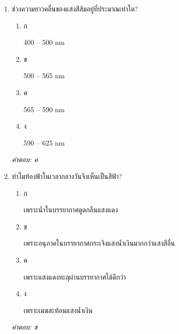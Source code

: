 \documentclass[12pt]{article}
\begin{document}
\begin{enumerate}[label=\arabic*., itemsep=0.5\baselineskip, topsep=0.5\baselineskip, leftmargin=*]
\item ช่วงความยาวคลื่นของแสงสีส้มอยู่ที่ประมาณเท่าใด?
\begin{enumerate}[label=\alph*)., itemsep=0.3\baselineskip, topsep=0.3\baselineskip]
\item ก\ 
\begin{minipage}[t]{0.9\linewidth}
\raggedright 400 – 500 nm
\end{minipage}
\item ข\ 
\begin{minipage}[t]{0.9\linewidth}
\raggedright 500 – 565 nm
\end{minipage}
\item ค\ 
\begin{minipage}[t]{0.9\linewidth}
\raggedright 565 – 590 nm
\end{minipage}
\item ง\ 
\begin{minipage}[t]{0.9\linewidth}
\raggedright 590 – 625 nm
\end{minipage}
\end{enumerate}
\vspace{-0.3\baselineskip}
\begin{small}
\textit{คำตอบ: ค}
\end{small}

\item ทำไมท้องฟ้าในเวลากลางวันจึงเห็นเป็นสีฟ้า?
\begin{enumerate}[label=\alph*)., itemsep=0.3\baselineskip, topsep=0.3\baselineskip]
\item ก\ 
\begin{minipage}[t]{0.9\linewidth}
\raggedright เพราะน้ำในบรรยากาศดูดกลืนแสงแดง
\end{minipage}
\item ข\ 
\begin{minipage}[t]{0.9\linewidth}
\raggedright เพราะอนุภาคในบรรยากาศกระเจิงแสงน้ำเงินมากกว่าแสงสีอื่น
\end{minipage}
\item ค\ 
\begin{minipage}[t]{0.9\linewidth}
\raggedright เพราะแสงแดงทะลุผ่านบรรยากาศได้ดีกว่า
\end{minipage}
\item ง\ 
\begin{minipage}[t]{0.9\linewidth}
\raggedright เพราะเมฆสะท้อนแสงน้ำเงิน
\end{minipage}
\end{enumerate}
\vspace{-0.3\baselineskip}
\begin{small}
\textit{คำตอบ: ข}
\end{small}


\end{enumerate}
\end{document}
